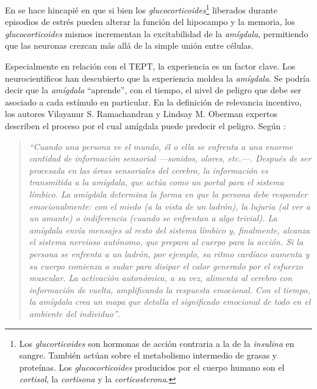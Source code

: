 En \cite{Sapolsky2004} se hace hincapié en que si bien los {\it glucocorticoides}\footnote{Los {\it glucorticoides} son hormonas de acción contraria a la de la {\it insulina} en sangre. También actúan sobre el metabolismo intermedio de grasas y proteínas. Los {\it glucocorticoides} producidos por el cuerpo humano son el {\it cortisol}, la {\it cortisona} y la {\it corticosterona}.} liberados durante episodios de estrés pueden alterar la función del hipocampo y la memoria, los {\it glucocorticoides} mismos incrementan la excitabilidad de la {\it amígdala}, permitiendo que las neuronas crezcan más allá de la simple unión entre células.


Especialmente en relación con el \acs{TEPT}, la experiencia es un factor clave. Los neurocientíficos han descubierto que la experiencia moldea la {\it amígdala}. Se podría decir que la {\it amígdala} ``aprende'', con el tiempo, el nivel de peligro que debe ser asociado a cada estímulo en particular. En la definición de relevancia incentivo, los autores Vilayanur S. Ramachandran y Lindsay M. Oberman expertos describen el proceso por el cual amígdala puede predecir el peligro. Según \cite{Oberman2006}:

\begin{quote}
{\it ``Cuando una persona ve el mundo, él o ella se enfrenta a una enorme cantidad de información sensorial ---sonidos, olores, etc.---. Después de ser procesada en las áreas sensoriales del cerebro, la información es transmitida a la amígdala, que actúa como un portal para el sistema límbico. La amígdala determina la forma en que la persona debe responder emocionalmente: con el miedo (a la vista de un ladrón), la lujuria (al ver a un amante) o indiferencia (cuando se enfrentan a algo trivial). La amígdala envía mensajes al resto del sistema límbico y, finalmente, alcanza el sistema nervioso autónomo, que prepara al cuerpo para la acción. Si la persona se enfrenta a un ladrón, por ejemplo, su ritmo cardíaco aumenta y su cuerpo comienza a sudar para disipar el calor generado por el esfuerzo muscular. La activación autonómica, a su vez, alimenta al cerebro con información de vuelta, amplificando la respuesta emocional. Con el tiempo, la amígdala crea un mapa que detalla el significado emocional de todo en el ambiente del individuo''}.
\end{quote}

